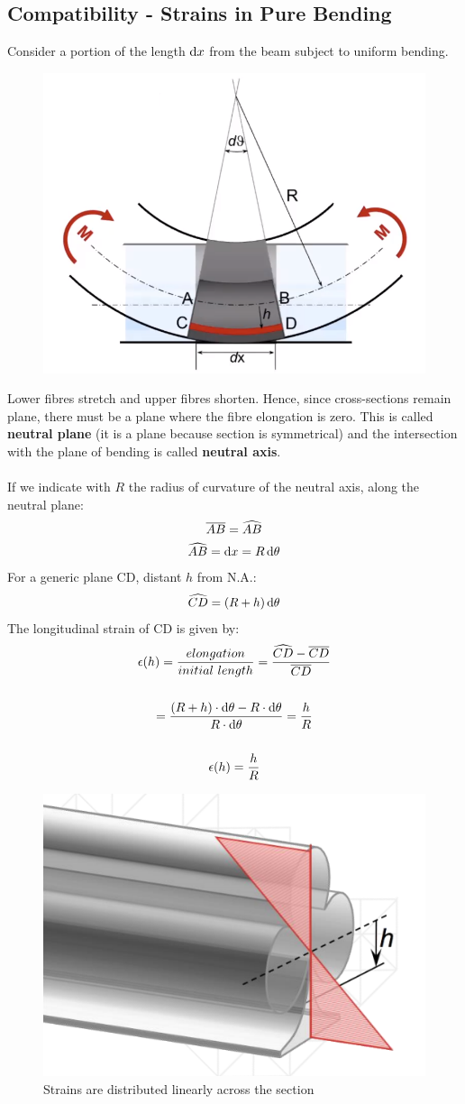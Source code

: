 \documentclass[class=report, crop=false, 12pt,a4paper]{standalone}
\begin{document}
\subsection{Compatibility - Strains in Pure Bending}
Consider a portion of the length $\dif x$ from the beam subject to uniform bending. 
\begin{figure}[H]
  \centering
  \includegraphics[width = 0.6 \textwidth]{../img/compatibility.PNG}
\end{figure}
Lower fibres stretch and upper fibres shorten. Hence, since cross-sections remain plane, there must be a plane where the fibre elongation is zero. This is called \textbf{neutral plane} (it is a plane because section is symmetrical) and the intersection with the plane of bending is called \textbf{neutral axis}. \\\\
If we indicate with $R$ the radius of curvature of the neutral axis, along the neutral plane:
\begin{gather}
  \overline{AB} = \widehat{AB} \\
  \widehat{AB} = \dif x = R\dif \theta
\end{gather}
For a generic plane CD, distant $h$ from N.A.:
\begin{gather}
  \widehat{CD} = (R+h)\dif \theta
\end{gather}
The longitudinal strain of CD is given by:
\begin{gather}
  \epsilon(h) = \frac{elongation}{initial\ length} = \frac{\widehat{CD}-\overline{CD}}{\overline{CD}} \\\\
  = \frac{(R+h)\cdot \dif \theta - R\cdot \dif \theta}{R\cdot \dif \theta} = \frac{h}{R} \\\\
  \epsilon(h) = \frac{h}{R}
  \label{epsilon}
\end{gather}
\begin{figure}[H]
  \centering
  \includegraphics[width = 0.3 \textwidth]{../img/straindistribution.PNG}
  \caption{Strains are distributed linearly across the section}
\end{figure}
\end{document}
